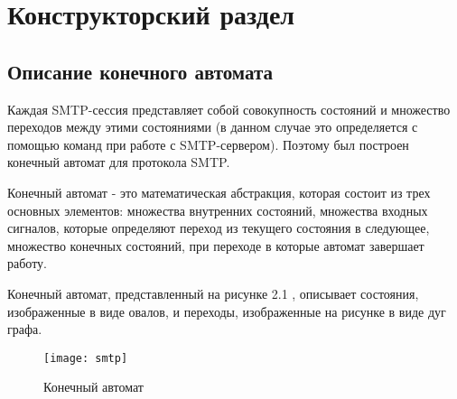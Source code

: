 \documentclass[a4paper,12pt]{report}
\begin{document}
	\chapter{Конструкторский раздел}
    
	\section{Описание конечного автомата}
    
	Каждая SMTP-сессия представляет собой совокупность состояний и множество переходов между этими состояниями (в данном случае это определяется с помощью команд при работе с SMTP-сервером). Поэтому был построен конечный автомат для протокола SMTP.

	Конечный автомат - это математическая абстракция, которая состоит из трех основных элементов: множества внутренних состояний, множества входных сигналов, которые определяют переход из текущего состояния в следующее, множество конечных состояний, при переходе в которые автомат завершает работу.

	Конечный автомат, представленный на рисунке 2.1 , описывает состояния, изображенные в виде овалов, и переходы, изображенные на рисунке в виде дуг графа.
	\begin{figure}
		\centering
		\texttt{[image: smtp]}
		\caption{Конечный автомат} 
	\end{figure}
\end{document}
